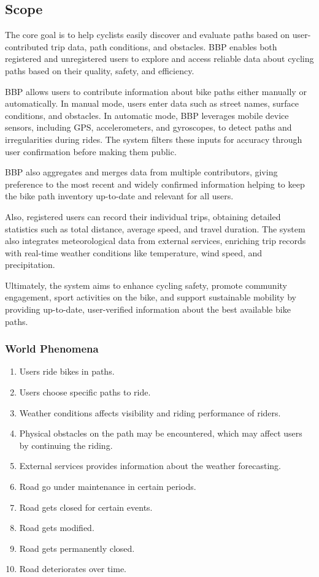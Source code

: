 \subsection{Scope}

The core goal is to help cyclists easily discover and evaluate paths based on user-contributed trip data, path conditions, and obstacles. BBP enables both registered and unregistered users to explore and access reliable data about cycling paths based on their quality, safety, and efficiency. 

BBP allows users to contribute information about bike paths either manually or automatically. In manual mode, users enter data such as street names, surface conditions, and obstacles. In automatic mode, BBP leverages mobile device sensors, including GPS, accelerometers, and gyroscopes, to detect paths and irregularities during rides. The system filters these inputs for accuracy through user confirmation before making them public.

BBP also aggregates and merges data from multiple contributors, giving preference to the most recent and widely confirmed information helping to keep the bike path inventory up-to-date and relevant for all users. 

Also, registered users can record their individual trips, obtaining detailed statistics such as total distance, average speed, and travel duration. The system also integrates meteorological data from external services, enriching trip records with real-time weather conditions like temperature, wind speed, and precipitation.

Ultimately, the system aims to enhance cycling safety, promote community engagement, sport activities on the bike, and support sustainable mobility by providing up-to-date, user-verified information about the best available bike paths. 

\subsubsection{World Phenomena}

\begin{enumerate}[label=\textbf{WP\arabic*:}]
    \item Users ride bikes in paths. 
    \item Users choose specific paths to ride.
    \item Weather conditions affects visibility and riding performance of riders.
    \item Physical obstacles on the path may be encountered, which may affect users by continuing the riding.
    \item External services provides information about the weather forecasting.
    \item Road go under maintenance in certain periods.
    \item Road gets closed for certain events.
    \item Road gets modified.
    \item Road gets permanently closed.
    \item Road deteriorates over time.
\end{enumerate}
